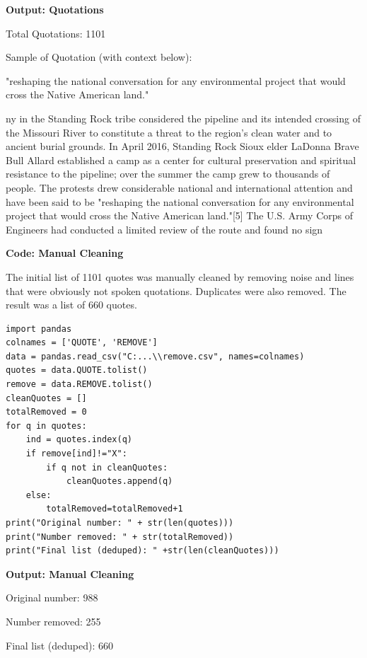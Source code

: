 \textbf{Output: Quotations}

\begin{footnotesize}

Total Quotations:
1101

Sample of Quotation (with context below):

"reshaping the national conversation for any environmental project that would cross the Native American land."

ny in the Standing Rock tribe considered the pipeline and its intended crossing of the Missouri River to constitute a threat to the region's clean water and to ancient burial grounds. In April 2016, Standing Rock Sioux elder LaDonna Brave Bull Allard established a camp as a center for cultural preservation and spiritual resistance to the pipeline; over the summer the camp grew to thousands of people.  The protests drew considerable  national and international attention and have been said to be "reshaping the national conversation for any environmental project that would cross the Native American land."[5] The U.S. Army Corps of Engineers had conducted a limited review of the route and found no sign

\end{footnotesize}

\textbf{Code: Manual Cleaning}

The initial list of 1101 quotes was manually cleaned by removing noise and lines that were obviously not spoken quotations. Duplicates were also removed. The result was a list of 660 quotes.

\begin{lstlisting}
import pandas
colnames = ['QUOTE', 'REMOVE']
data = pandas.read_csv("C:...\\remove.csv", names=colnames)
quotes = data.QUOTE.tolist()
remove = data.REMOVE.tolist()
cleanQuotes = []
totalRemoved = 0
for q in quotes:
	ind = quotes.index(q)
	if remove[ind]!="X":
		if q not in cleanQuotes:
			cleanQuotes.append(q)
	else:
		totalRemoved=totalRemoved+1
print("Original number: " + str(len(quotes)))
print("Number removed: " + str(totalRemoved))
print("Final list (deduped): " +str(len(cleanQuotes)))
\end{lstlisting}

\textbf{Output: Manual Cleaning}

\begin{footnotesize}
Original number: 988

Number removed: 255

Final list (deduped): 660
\end{footnotesize}


